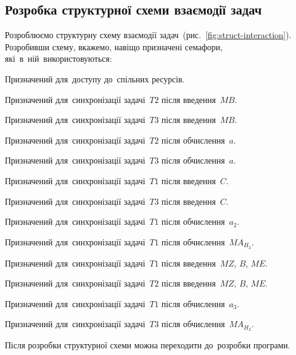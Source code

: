\documentclass[
  a4paper,
  oneside,
  BCOR = 10mm,
  DIV = 12,
  12pt,
  headings = normal,
]{scrartcl}
\newlength{\gridunitwidth}
\begin{document}
    \subsection{Розробка структурної схеми взаємодії задач}
      Розроблюємо структурну схему взаємодії задач~(рис.~\ref{fig:struct-interaction}). Розробивши схему, вкажемо, навіщо призначені семафори, які~в~ній~використовуються:
      \begin{description}[
        leftmargin = 2.5\gridunitwidth,
        style = nextline,
      ]
        \item [$\text{Sem}_{cr}$] Призначений для~доступу до~спільних ресурсів.
        \item [$\text{Sem}_{2,MB}$] Призначений для~синхронізації задачі~$T2$ після введення~$MB$.
        \item [$\text{Sem}_{3,MB}$] Призначений для~синхронізації задачі~$T3$ після введення~$MB$.
        \item [$\text{Sem}_{2,a}$] Призначений для~синхронізації задачі~$T2$ після обчислення~$a$.
        \item [$\text{Sem}_{3,a}$] Призначений для~синхронізації задачі~$T3$ після обчислення~$a$.
        \item [$\text{Sem}_{1,C}$] Призначений для~синхронізації задачі~$T1$ після введення~$C$.
        \item [$\text{Sem}_{3,C}$] Призначений для~синхронізації задачі~$T3$ після введення~$C$.
        \item [$\text{Sem}_{1,a_{2}}$] Призначений для~синхронізації задачі~$T1$ після обчислення~$a_2$.
        \item [$\text{Sem}_{1,MA_{H_{2}}}$] Призначений для~синхронізації задачі~$T1$ після обчислення~$MA_{H_{2}}$.
        \item [$\text{Sem}_{1,MZBME}$] Призначений для~синхронізації задачі~$T1$ після введення~$MZ$, $B$, $ME$.
        \item [$\text{Sem}_{2,MZBME}$] Призначений для~синхронізації задачі~$T2$ після введення~$MZ$, $B$, $ME$.
        \item [$\text{Sem}_{1,a_{3}}$] Призначений для~синхронізації задачі~$T1$ після обчислення~$a_3$.
        \item [$\text{Sem}_{1,MA_{H_{3}}}$] Призначений для~синхронізації задачі~$T3$ після обчислення~$MA_{H_{2}}$.
      \end{description}
      Після розробки структурної схеми можна переходити до~розробки програми.
\end{document}

